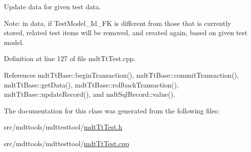 Update data for given test data. 

Note\-: in data, if Test\-Model\-\_\-\-Id\-\_\-\-F\-K is different from those that is currently stored, related test items will be removed, and created again, based on given test model. 

Definition at line 127 of file mdt\-Tt\-Test.\-cpp.



References mdt\-Tt\-Base\-::begin\-Transaction(), mdt\-Tt\-Base\-::commit\-Transaction(), mdt\-Tt\-Base\-::get\-Data(), mdt\-Tt\-Base\-::rollback\-Transaction(), mdt\-Tt\-Base\-::update\-Record(), and mdt\-Sql\-Record\-::value().



The documentation for this class was generated from the following files\-:\begin{DoxyCompactItemize}
\item 
src/mdttools/mdttesttool/\hyperlink{mdt_tt_test_8h}{mdt\-Tt\-Test.\-h}\item 
src/mdttools/mdttesttool/\hyperlink{mdt_tt_test_8cpp}{mdt\-Tt\-Test.\-cpp}\end{DoxyCompactItemize}
